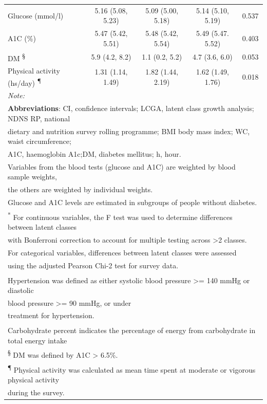 \begin{table}
\begin{tabular}[t]{lcccc}
		Glucose (mmol/l) & 5.16 (5.08, 5.23) & 5.09 (5.00, 5.18) & 5.14 (5.10, 5.19) & 0.537\\
		A1C (\%) & 5.47 (5.42, 5.51) & 5.48 (5.42, 5.54) & 5.49 (5.47. 5.52) & 0.403\\
		DM \textsuperscript{\S} & 5.9 (4.2, 8.2) & 1.1 (0.2, 5.2) & 4.7 (3.6, 6.0) & 0.053\\
        Physical activity (hs/day) \textsuperscript{\P}& 1.31 (1.14, 1.49) & 1.82 (1.44, 2.19) & 1.62 (1.49, 1.76) & 0.018\\
		\bottomrule
		\multicolumn{5}{l}{\textit{Note: }}\\
		\multicolumn{5}{l}{\textbf{Abbreviations}: CI, confidence intervals; LCGA, latent class growth analysis; NDNS RP, national}\\ 
		\multicolumn{5}{l}{dietary and nutrition survey rolling programme; BMI body mass index; WC, waist circumference; }\\
		\multicolumn{5}{l}{A1C, haemoglobin A1c;DM, diabetes mellitus; h, hour.}\\
		\multicolumn{5}{l}{Variables from the blood tests (glucose and A1C) are weighted by blood sample weights,}\\
		\multicolumn{5}{l}{the others are weighted by individual weights.}\\
		\multicolumn{5}{l}{Glucose and A1C levels are estimated in subgroups of people without diabetes.}\\
		\multicolumn{5}{l}{\textsuperscript{*} For continuous variables, the F test was used to determine differences between latent classes}\\   
		\multicolumn{5}{l}{with Bonferroni correction to account for multiple testing across >2 classes.}\\
		\multicolumn{5}{l}{For categorical variables, differences between latent classes were assessed}\\
		\multicolumn{5}{l}{using the adjusted Pearson Chi-2 test for survey data.}\\
		\multicolumn{5}{l}{\textsuperscript{\dag} Hypertension was defined as either systolic blood pressure >= 140 mmHg or diastolic}\\ 
		\multicolumn{5}{l}{blood pressure >= 90 mmHg, or under}\\
		\multicolumn{5}{l}{treatment for hypertension.}\\
		\multicolumn{5}{l}{\textsuperscript{\ddag} Carbohydrate percent indicates the percentage of energy from carbohydrate in total energy intake}\\
		\multicolumn{5}{l}{\textsuperscript{\S} DM was defined by A1C > 6.5\%.}\\
		\multicolumn{5}{l}{\textsuperscript{\P} Physical activity was calculated as mean time spent at moderate or vigorous physical activity}\\ 
		\multicolumn{5}{l}{during the survey.}\\
	\end{tabular}
\end{table}

